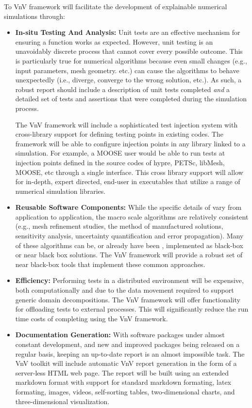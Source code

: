 To VnV framework will facilitate the development of explainable numerical simulations through:

\begin{itemize}
 
 \item{ \bf In-situ Testing And Analysis:} Unit tests are an effective mechanism for ensuring a function works as expected. However, unit testing is an unavoidably discrete process that cannot cover every possible outcome. This is particularly true for numerical algorithms because even small changes (e.g., input parameters, mesh geometry. etc.) can cause the algorithms to behave unexpectedly (i.e., diverge, converge to the wrong solution, etc.). As such, a robust \VV report should include a description of unit tests completed \emph{and} a detailed set of tests and assertions that were completed during the simulation process. 
 
 The VnV framework will include a sophisticated test injection system with cross-library support for defining testing points in existing codes. The framework will be able to configure injection points in any library linked to a simulation. For example, a MOOSE user would be able to run \VV tests at injection points defined in the source codes of hypre, PETSc, libMesh, MOOSE, etc through a single interface. This cross library support will allow for in-depth, expert directed, end-user \VV in executables that utilize a range of numerical simulation libraries. 
 
 \item {\bf Reusable Software Components:} While the specific details of \VV vary from application to application, the macro scale algorithms are relatively consistent (e.g., mesh refinement studies, the method of manufactured solutions, sensitivity analysis, uncertainty quantification and error propagation). Many of these algorithms can be, or already have been \cite{DAKOTA,MASA},  implemented as black-box or near black box solutions. The VnV framework will provide a robust set of near black-box tools that implement these common \VV approaches. 
  
 \item{\bf Efficiency:}  Performing \VV tests in a distributed environment will be expensive, both computationally and due to the data movement required to support generic domain decompositions. The VnV framework will offer functionality for offloading tests to external processes. This will significantly reduce the run time costs of completing \VV using the VnV framework.
 
 \item{\bf Documentation Generation:} With software packages under almost constant development, and new and improved packages being released on a regular basis, keeping an up-to-date \VV report is an almost impossible task. The VnV toolkit will include automatic VnV report generation in the form of a server-less HTML web page. The report will be built using an extended markdown format with support for standard markdown formating, latex formating, images, videos, self-sorting tables, two-dimensional charts, and three-dimensional visualization. 
 \end{itemize}

